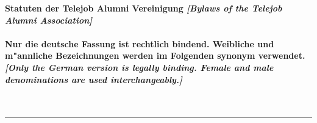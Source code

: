 \documentclass[10pt]{article}
\newcommand{\makeheading}[2][]%
        {\hspace*{-\marginparsep minus \marginparwidth}%
         \begin{minipage}[t]{\textwidth+\marginparwidth+\marginparsep}%
             {\large \bfseries #2 \hfill #1}\\[-0.15\baselineskip]%
                 \rule{\columnwidth}{1pt}%
         \end{minipage}}
\begin{document}
\makeheading{Statuten der Telejob Alumni Vereinigung {\it [Bylaws of the Telejob Alumni Association]}\\\\
\small{Nur die deutsche Fassung ist rechtlich bindend. Weibliche und m"annliche Bezeichnungen werden im Folgenden synonym verwendet. \\ {\it[Only the German version is legally binding. Female and male denominations are used interchangeably.]}}\\\\
}



\vspace{30pt}
\end{document}
